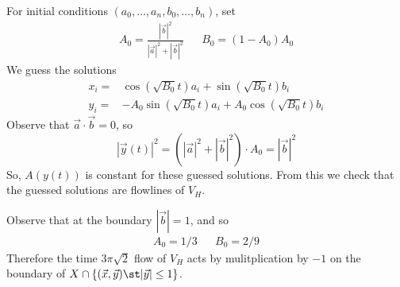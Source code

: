 \begin{enumerate}
For initial conditions $(a_0, \ldots, a_n, b_0, \ldots, b_n)$, set 
\begin{align*}
    A_0 = \frac{|\vec b|^2}{|\vec a|^2 +|\vec b|^2}  && B_0=(1-A_0)A_0
\end{align*}
We guess the solutions
\begin{align*}x_i =& \cos(\sqrt{B_0}t ) a_i + \sin(\sqrt{B_0}t)b_i \\
y_i =& -A_0\sin(\sqrt{B_0}t) a_i  + A_0\cos(\sqrt{B_0}t) b_i
\end{align*}
Observe that $\vec a \cdot \vec b =0$, so 
\[|\vec y(t)|^2=(|\vec a|^2 + |\vec b|^2)\cdot A_0 = |\vec b|^2\]
So, $A(y(t))$ is constant for these guessed solutions. From this we check that the guessed solutions are flowlines of $V_H$.

Observe that at the boundary $|\vec b|=1$, and so  
\begin{align*}
    A_0=1/3 && B_0=2/9
\end{align*}
 Therefore the time $3\pi \sqrt{2}$ flow of $V_H$ acts by mulitplication by $-1$ on the boundary of $X\cap \{(\vec x, \vec y) \st |\vec y|\leq 1\}$.



\end{enumerate}